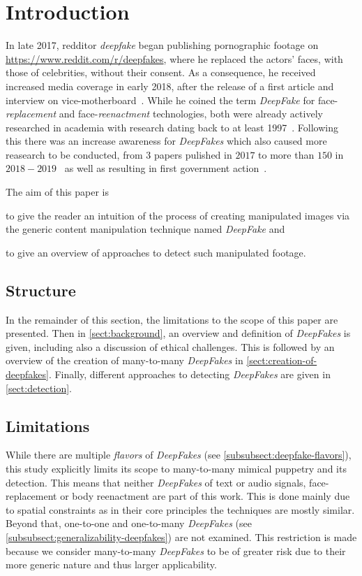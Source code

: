 \section{Introduction}
In late 2017, \gls{redditor} \textit{deepfake} began publishing pornographic footage
on \url{https://www.reddit.com/r/deepfakes}, where he replaced the actors' faces,
with those of celebrities, without their consent. As a consequence, he
received increased media coverage in early 2018, after the release of a first 
article and interview on vice-motherboard~\cite{Cole.2017}. While he coined the
term \textit{DeepFake} for face-\textit{replacement} and face-\textit{reenactment}
technologies, both were already actively researched in academia with research 
dating back to at least 1997~\cite{Bregler.1997}.
Following this there was an increase awareness for \textit{DeepFakes} which also
caused more reasearch to be conducted, from \(3\) papers pulished in \(2017\) to
more than \(150\) in \(2018-2019\)~\cite{mirsky_creation_2020} as well as
resulting in first government action~\cite{senate_-_homeland_security_and_governmental_affairs__house_-_energy_and_commerce_deepfake_2019}.

\par
The aim of this paper is
\begin{enumerate*}[a.)]
    \item to give the reader an intuition of the process of creating manipulated
    images via the generic content manipulation technique named \textit{DeepFake}
    and
    \item to give an overview of approaches to detect such manipulated footage.
\end{enumerate*}

\subsection{Structure}
In the remainder of this section, the limitations to the scope of this paper are
presented. Then in \cref{sect:background}, an overview and definition of \textit{DeepFakes}
is given, including also a discussion of ethical challenges.
This is followed by an overview of the creation of many-to-many \textit{DeepFakes}
in \cref{sect:creation-of-deepfakes}. Finally, different approaches to detecting
\textit{DeepFakes} are given in \cref{sect:detection}.

\subsection{Limitations}\label{subsect:limitations}
While there are multiple \textit{flavors} of \textit{DeepFakes} (see \cref{subsubsect:deepfake-flavors}),
this study explicitly limits its scope to many-to-many mimical puppetry and its
detection. This means that neither \textit{DeepFakes} of text or audio signals,
face-replacement or body reenactment are part of this work. This is done mainly
due to spatial constraints as in their core principles the techniques are mostly
similar. Beyond that, one-to-one and one-to-many \textit{DeepFakes} (see \cref{subsubsect:generalizability-deepfakes})
are not examined. This restriction is made because we consider many-to-many \textit{DeepFakes}
to be of greater risk due to their more generic nature and thus larger applicability.